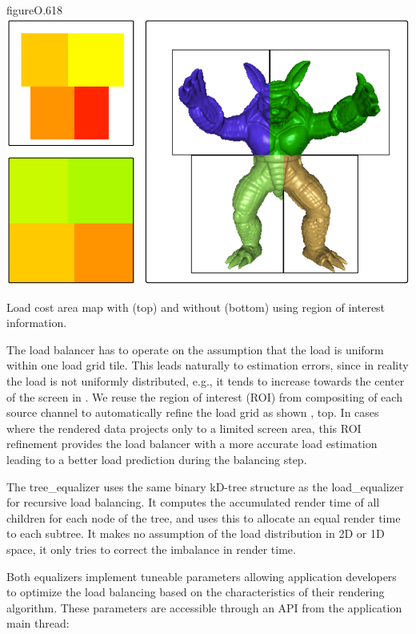 \begin{wrapfloat}{figure}{O}{.618\textwidth}
  \includegraphics[width=.618\textwidth]{images/roi}
  \caption{Load cost area map with (top) and without (bottom) using region of interest information.}
  \label{fROI}
\end{wrapfloat}

The load balancer has to operate on the assumption that the load is uniform
within one load grid tile. This leads naturally to estimation errors, since in
reality the load is not uniformly distributed, e.g., it tends to increase
towards the center of the screen in . We reuse the region of interest
(ROI) from compositing of each source channel to automatically refine the load
grid as shown , top. In cases where the rendered data projects only
to a limited screen area, this ROI refinement provides the load balancer with a
more accurate load estimation leading to a better load prediction during the
balancing step.

The \textsf{tree\_equalizer} uses the same binary kD-tree structure as the
\textsf{load\_equalizer} for recursive load balancing. It computes the
accumulated render time of all children for each node of the tree, and uses
this to allocate an equal render time to each subtree. It makes no assumption
of the load distribution in 2D or 1D space, it only tries to correct the
imbalance in render time.

Both equalizers implement tuneable parameters allowing application developers
to optimize the load balancing based on the characteristics of their rendering
algorithm. These parameters are accessible through an API from the application
main thread:

